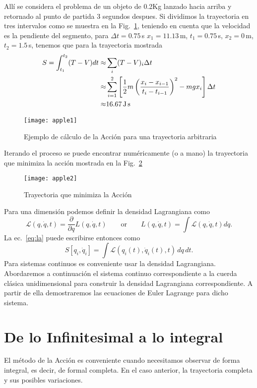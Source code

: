 Allí se considera el problema de un objeto de 0.2Kg lanzado hacia arriba y retornado al punto de partida 3 segundos despues. Si dividimos la trayectoria en tres intervalos como se muestra en la Fig.~\ref{fig:apple1}, teniendo en cuenta que la velocidad es la pendiente del segmento, para $\Delta t=0.75\,$s $x_1=11.13\,$m, $t_1=0.75\,$s, $x_2=0\,$m, $t_2=1.5\,$s, tenemos que para la trayectoria mostrada
\begin{align}
  S=\int_{t_1}^{t_2}(T-V)dt\approx&\sum_i(T-V)_i\Delta t\nonumber\\
  \approx&\sum_{i=1}^2\left[\frac{1}{2}m\left(\frac{x_i-x_{i-1}}{t_i-t_{i-1}}\right)^2-m g x_i\right]\Delta t\nonumber\\
  \approx&16.67\,\text{J\,s}
\end{align}
\begin{figure}
  \centering
  \texttt{[image: apple1]}
  \caption{Ejemplo de c\'alculo de la Acci\'on para una trayectoria arbitraria}
  \label{fig:apple1}
\end{figure}
Iterando el proceso se puede encontrar num\'ericamente (o a mano) la trayectoria que minimiza la acci\'on mostrada en la Fig.~\ref{fig:apple2}
\begin{figure}
  \centering
\texttt{[image: apple2]}
  \caption{Trayectoria que minimiza la Acci\'on}
\label{fig:apple2}
\end{figure}
Para una dimensi\'on podemos definir la densidad Lagrangiana como
\begin{equation}
  \mathcal{L}(q,\dot q,t)=\frac{\partial}{\partial q}L(q,\dot q,t)\qquad\text{or}\qquad L(q,\dot q,t)=\int\mathcal{L}(q,\dot q,t)dq.
\end{equation}
La ec.~\eqref{eq:la} puede escribirse entonces como
\begin{equation}
   S\left[q_i,\dot{q}_i\right] = \int \mathcal{L}(q_i(t), \dot{q}_i(t),t)\, dq\,dt.
\end{equation}
Para sistemas continuos es conveniente usar la densidad Lagrangiana. Abordaremos a continuaci\'on el sistema continuo correspondiente a la cuerda cl\'asica unidimensional para construir la densidad Lagrangiana correspondiente. A partir de ella demostraremos las ecuaciones de Euler Lagrange para dicho sistema.


\section{De lo Infinitesimal a lo integral}
El método de la Acción es conveniente cuando necesitamos observar de forma integral, es decir, de formal completa. En el caso anterior, la trayectoria completa y sus posibles variaciones.


